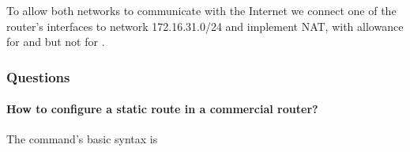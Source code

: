 \documentclass[compilation.tex]{subfiles}
\begin{document}
To allow both networks to communicate with the Internet we connect one of the router's interfaces to network 172.16.31.0/24 and implement NAT, with allowance for  and  but not for .

\subsubsection{Questions}
\label{subsubsec:exp4questions}

\paragraph{How to configure a static route in a commercial router?}
The command's basic syntax is
\begin{center}
\end{center}
\end{document}

